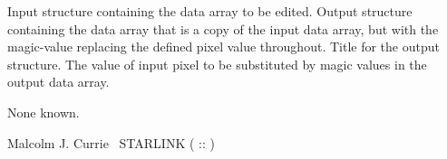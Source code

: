 {\begin{manroutinedescription}
\begin{manparametertable}
  Input {} structure containing the data array to be edited.
  Output {} structure containing the data array that is a
  copy of the input data array, but with the magic-value
  replacing the defined pixel value throughout.
  Title for the output {} structure.
  \mbox{{}}
  The value of input pixel to be substituted by magic values in
  the output data array.
\end{manparametertable}
  None known.

  Malcolm J. Currie ~STARLINK ( {}::{} )
\end{manroutinedescription}

}
